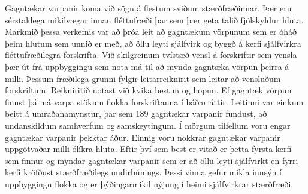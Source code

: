 Gagntækar varpanir koma við sögu á flestum sviðum stærðfræðinnar. Þær eru sérstaklega mikilvægar innan fléttufræði þar sem þær geta talið fjölskyldur hluta. Markmið þessa verkefnis var að þróa leit að gagntækum vörpunum sem er óháð þeim hlutum sem unnið er með, að öllu leyti sjálfvirk og byggð á kerfi sjálfvirkra fléttufræðilegra forskrifta. Við skilgreinum tvístæð vensl á forskriftir sem vensla þær út frá uppbyggingu sem nota má til að mynda gagntæka vörpun þeirra á milli. Þessum fræðilega grunni fylgir leitarreiknirit sem leitar að vensluðum forskriftum. Reikniritið notast við kvika bestun og hopun. Ef gagntæk vörpun finnst þá má varpa stökum flokka forskriftanna í báðar áttir. Leitinni var einkum beitt á umraðanamynstur, þar sem 189 gagntækar varpanir fundust, að undanskildum samhverfum og samskeytingum. Í mörgum tilfellum voru engar gagntækar varpanir þekktar áður. Einnig voru nokkrar gagntækar varpanir uppgötvaðar milli ólíkra hluta. Eftir því sem best er vitað er þetta fyrsta kerfi sem finnur og myndar gagntækar varpanir sem er að öllu leyti sjálfvirkt en fyrri kerfi kröfðust stærðfræðilegs undirbúnings. Þessi vinna gefur mikla innsýn í uppbyggingu flokka og er þýðingarmikil nýjung í heimi sjálfvirkrar stærðfræði.
